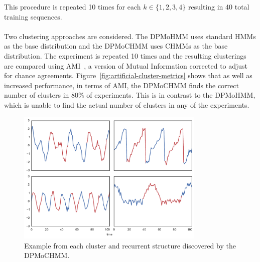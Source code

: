 \documentclass[12pt]{report}
\newcommand{\1}[0]{\mathbbm{1}}
\begin{document}
This procedure is repeated 10 times for each $k \in \{1,2,3,4\}$ resulting in 40
total training sequences.
\\\\
Two clustering approaches are considered. The \ac{DPMoHMM} uses standard \acp{HMM}
as the base distribution and the \ac{DPMoCHMM} uses \acp{CHMM} as the base distribution.
The experiment is repeated 10 times and the resulting clusterings are compared using
\ac{AMI}~\cite{ami}, a version of Mutual Information corrected to adjust for chance agreements.
Figure~\ref{fig:artificial-cluster-metrics} shows that as well as increased performance,
in terms of \ac{AMI}, the \ac{DPMoCHMM} finds the correct number of clusters in 80\% of experiments.
This is in contrast to the \ac{DPMoHMM}, which is unable to find the actual number of clusters in any
of the experiments.

\begin{figure}[H]
    \centering
    \includegraphics[width=0.8\textwidth]{./img/artificial-clusters.pdf}
    \caption[Visualization of synthetic sequence clusters]{
        Example from each cluster and recurrent structure
        discovered by the \ac{DPMoCHMM}.
    }
    \label{fig:artificial-clusters}
\end{figure}
\end{document}
